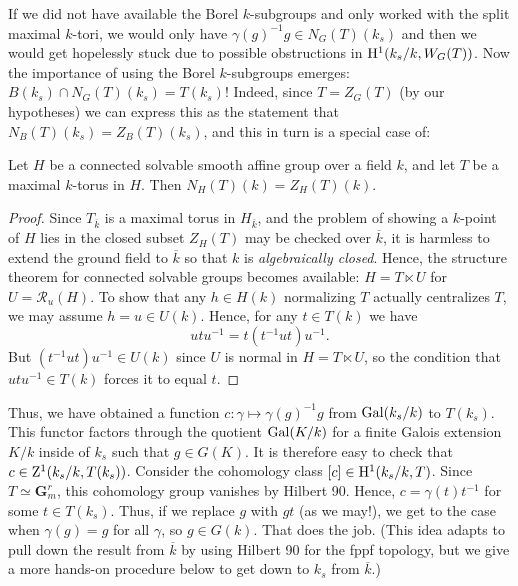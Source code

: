 \documentclass[10pt]{article}
\renewcommand{\(}{\left(}
\renewcommand{\)}{\right)}
\numberwithin{thm}{subsection}
\begin{document}
If we did not have available the Borel $k$-subgroups
and only worked with the split maximal $k$-tori, we would only have
$\gamma(g)^{-1}g \in N_G(T)(k_s)$ and then we would get hopelessly stuck
due to possible obstructions in ${\rm{H}}^1(k_s/k, W_G(T))$.
Now the importance of using the Borel $k$-subgroups
emerges:  $B(k_s) \cap N_G(T)(k_s) = T(k_s)$!  Indeed, since $T = Z_G(T)$ (by our hypotheses) we can express this as the statement that
$N_B(T)(k_s) = Z_B(T)(k_s)$, and this in turn is a special case of:

\begin{lemma} Let $H$ be a connected solvable smooth affine group over
a field $k$, and let $T$ be a maximal $k$-torus in $H$.  Then
$N_H(T)(k) = Z_H(T)(k)$.
\end{lemma}

\begin{proof}
Since $T_{\overline{k}}$ is a maximal torus in $H_{\overline{k}}$,
and the problem of showing a $k$-point of $H$ lies in the closed subset $Z_H(T)$
may be checked over $\overline{k}$, it is harmless to extend the ground
field to $\overline{k}$ so that $k$ is {\em algebraically closed}.
Hence, the structure theorem for connected solvable groups
becomes available:  $H = T \ltimes U$ for $U = \mathscr{R}_u(H)$.
To show that any $h \in H(k)$ normalizing $T$ actually centralizes $T$, we may assume
$h = u \in U(k)$.  Hence, for any $t \in T(k)$ we have
$$utu^{-1} = t(t^{-1}ut)u^{-1}.$$
But $(t^{-1}ut)u^{-1} \in U(k)$ since $U$ is normal in $H = T \ltimes U$, so
the condition that $utu^{-1} \in T(k)$ forces it to equal $t$.
\end{proof}

Thus, we have obtained a function $c:\gamma \mapsto \gamma(g)^{-1}g$ from ${\rm{Gal}}(k_s/k)$ to $T(k_s)$.
This functor factors through the quotient ${\rm{Gal}}(K/k)$ for a finite Galois extension $K/k$ inside of
$k_s$ such that $g \in G(K)$.  It is therefore easy to check that $c \in {\rm{Z}}^1(k_s/k, T(k_s))$. 
Consider the cohomology class $[c] \in {\rm{H}}^1(k_s/k,T)$.  Since $T \simeq \mathbf{G}_m^r$, this
cohomology group vanishes by Hilbert 90.  Hence, $c = \gamma(t)t^{-1}$ for some $t \in T(k_s)$.
Thus, if we replace $g$ with $gt$ (as we may!), we get to the case when $\gamma(g) = g$ for all $\gamma$,
so $g \in G(k)$.  That does the job.  (This idea adapts to pull down the result
from $\overline{k}$ by using Hilbert 90 for the fppf topology, but we give a more hands-on procedure below
to get down to $k_s$ from $\overline{k}$.) 
\end{document}
